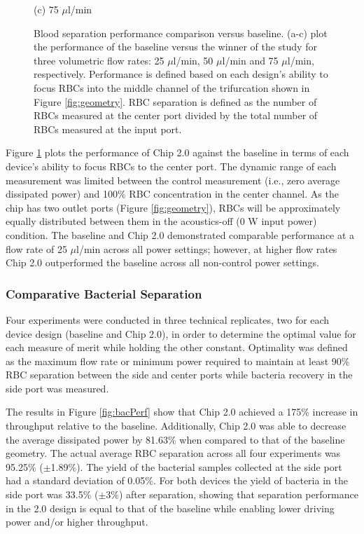 \begin{figure}[H]
\begin{minipage}[t]{0.99\linewidth}
    \medskip
    \centerline{(c) 75 $\mu$l/min}
  \end{minipage}
  \caption[Separation Performance Comparison Versus Baseline]{Blood separation performance comparison versus baseline. (a-c) plot the performance of the baseline versus the winner of the study for three volumetric flow rates: 25 $\mu$l/min, 50 $\mu$l/min and 75 $\mu$l/min, respectively. Performance is defined based on each design's ability to focus RBCs into the middle channel of the trifurcation shown in Figure \ref{fig:geometry}. RBC separation is defined as the number of RBCs measured at the center port divided by the total number of RBCs measured at the input port.}
	\label{fig:headToHeadBlood}
\end{figure}


Figure \ref{fig:headToHeadBlood} plots the performance of Chip 2.0 against the baseline in terms of each device's ability to focus RBCs to the center port. The dynamic range of each measurement was limited between the control measurement (i.e., zero average dissipated power) and 100\% RBC concentration in the center channel. As the chip has two outlet ports (Figure \ref{fig:geometry}), RBCs will be approximately equally distributed between them in the acoustics-off (0 W input power) condition. The baseline and Chip 2.0 demonstrated comparable performance at a flow rate of 25 $\mu$l/min across all power settings; however, at higher flow rates Chip 2.0 outperformed the baseline across all non-control power settings. 



\subsubsection{Comparative Bacterial Separation}
\label{sssec:comparisonBacteria}

Four experiments were conducted in three technical replicates, two for each device design (baseline and Chip 2.0),  in order to determine the optimal value for each measure of merit while holding the other constant. Optimality was defined as the maximum flow rate or minimum power required to maintain at least 90\% RBC separation between the side and center ports while bacteria recovery in the side port was measured. 

The results in Figure \ref{fig:bacPerf} show that Chip 2.0 achieved a 175\% increase in throughput relative to the baseline. Additionally, Chip 2.0 was able to decrease the average dissipated power by 81.63\% when compared to that of the baseline geometry. The actual average RBC separation across all four experiments was 95.25\% ($\pm$1.89\%). The yield of the bacterial samples collected at the side port had a standard deviation of 0.05\%.  For both devices the yield of bacteria in the side port was 33.5\% ($\pm$3\%) after separation, showing that separation performance in the 2.0 design is equal to that of the baseline while enabling lower driving power and/or higher throughput.

